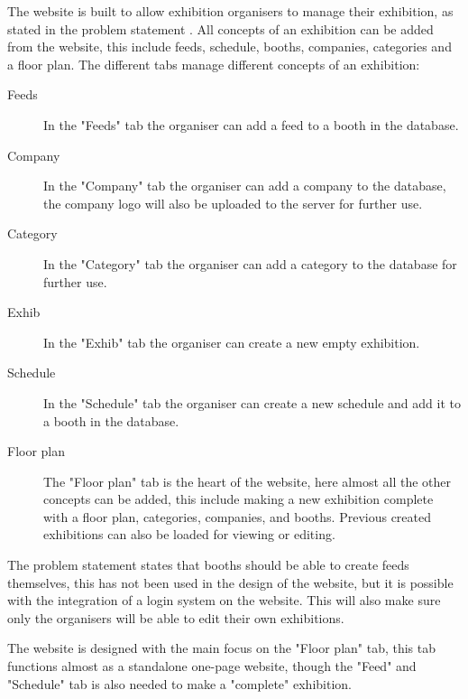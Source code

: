 \label{sec:websiteimplementation}
The website is built to allow exhibition organisers to manage their exhibition, as stated in the problem statement . All concepts of an exhibition can be added from the website, this include feeds, schedule, booths, companies, categories and a floor plan.
The different tabs manage different concepts of an exhibition:

\begin{description}
	\item[Feeds] In the "Feeds" tab the organiser can add a feed to a booth in the database.
	\item[Company] In the "Company" tab the organiser can add a company to the database, the company logo will also be uploaded to the server for further use.
	\item[Category] In the "Category" tab the organiser can add a category to the database for further use.
	\item[Exhib] In the "Exhib" tab the organiser can create a new empty exhibition.
	\item[Schedule] In the "Schedule" tab the organiser can create a new schedule and add it to a booth in the database.
	\item[Floor plan] The "Floor plan" tab is the heart of the website, here almost all the other concepts can be added, this include making a new exhibition complete with a floor plan, categories, companies, and booths. Previous created exhibitions can also be loaded for viewing or editing.
\end{description}

The problem statement  states that booths should be able to create feeds themselves, this has not been used in the design of the website, but it is possible with the integration of a login system on the website. This will also make sure only the organisers will be able to edit their own exhibitions.

The website is designed with the main focus on the "Floor plan" tab, this tab functions almost as a standalone one-page website, though the "Feed" and "Schedule" tab is also needed to make a "complete" exhibition.

